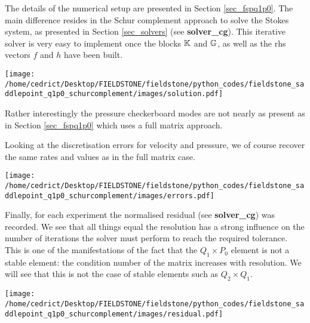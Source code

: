 The details of the numerical setup are presented in Section \ref{sec_fspq1p0}.
The main difference resides in the Schur complement approach to solve the 
Stokes system, as presented in Section \ref{sec_solvers} (see {\bf solver\_cg}).
This iterative solver is very easy to implement once the blocks ${\mathbb{K}}$ and ${\mathbb{G}}$, 
as well as the rhs vectors $f$ and $h$ have been built. 



\texttt{[image: /home/cedrict/Desktop/FIELDSTONE/fieldstone/python\_codes/fieldstone\_saddlepoint\_q1p0\_schurcomplement/images/solution.pdf]}

Rather interestingly the pressure checkerboard modes are not nearly as present as in Section \ref{sec_fspq1p0} which uses a full matrix approach. 

Looking at the discretisation errors for velocity and pressure, we of course recover the same rates and values as in the full matrix case.

\texttt{[image: /home/cedrict/Desktop/FIELDSTONE/fieldstone/python\_codes/fieldstone\_saddlepoint\_q1p0\_schurcomplement/images/errors.pdf]}

Finally, for each experiment the normalised residual (see {\bf solver\_cg}) was recorded. We see that 
all things equal the resolution has a strong influence on the number of iterations the solver must
perform to reach the required tolerance. This is one of the manifestations of the fact that the 
$Q_1 \times P_0$ element is not a stable element: the condition number of the matrix increases with 
resolution. We will see that this is not the case of stable elements such as $Q_2\times Q_1$.

\texttt{[image: /home/cedrict/Desktop/FIELDSTONE/fieldstone/python\_codes/fieldstone\_saddlepoint\_q1p0\_schurcomplement/images/residual.pdf]}
 

